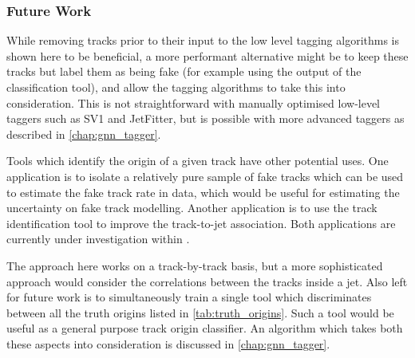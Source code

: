 \subsubsection{Future Work}
While removing tracks prior to their input to the low level tagging algorithms is shown here to be beneficial, a more performant alternative might be to keep these tracks but label them as being fake (for example using the output of the classification tool), and allow the tagging algorithms to take this into consideration.
This is not straightforward with manually optimised low-level taggers such as SV1 and JetFitter, but is possible with more advanced taggers as described in \cref{chap:gnn_tagger}.

Tools which identify the origin of a given track have other potential uses.
One application is to isolate a relatively pure sample of fake tracks which can be used to estimate the fake track rate in data, which would be useful for estimating the uncertainty on fake track modelling.
Another application is to use the \bhadron track identification tool to improve the track-to-jet association.
Both applications are currently under investigation within \ATLAS.

The approach here works on a track-by-track basis, but a more sophisticated approach would consider the correlations between the tracks inside a jet.
Also left for future work is to simultaneously train a single tool which discriminates between all the truth origins listed in \cref{tab:truth_origins}.
Such a tool would be useful as a general purpose track origin classifier.
An algorithm which takes both these aspects into consideration is discussed in \cref{chap:gnn_tagger}.
